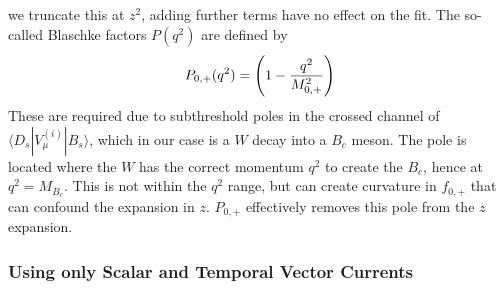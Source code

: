 we truncate this at $z^2$, adding further terms have no effect on the fit. The so-called Blaschke factors $P(q^2)$
are defined by
\begin{align}
	P_{0,+}(q^2) = \left( 1 - {q^2\over M_{0,+}^2}\right)
\end{align}
These are required due to subthreshold poles in the crossed channel of $\langle D_s | V^{(i)}_{\mu} | B_s \rangle$, which in our case is a $W$ decay into a $B_c$ meson. The pole is located where the $W$ has the correct momentum $q^2$ to create the $B_c$, hence at $q^2=M_{B_c}$. This is not within the $q^2$ range, but can create curvature in $f_{0,+}$ that can confound the expansion in $z$. $P_{0,+}$ effectively removes this pole from the $z$ expansion.

\subsubsection{Using only Scalar and Temporal Vector Currents}

